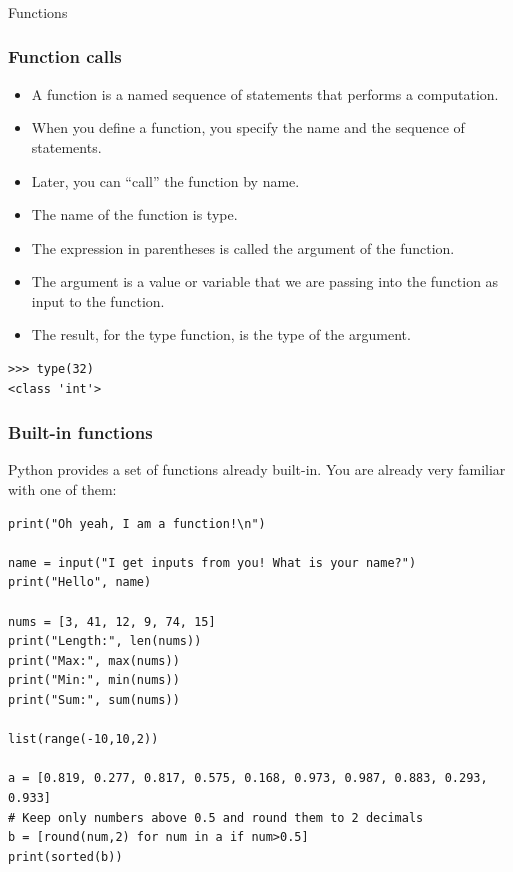 \begin{frame}[fragile]\frametitle{}
\begin{center}
{\Large Functions}
\end{center}
\end{frame}


\begin{frame}[fragile]\frametitle{Function calls}
    \begin{itemize}
    \item  A function is a named sequence of statements that
performs a computation.
    \item  When you define a function, you specify the name and
the sequence of statements.
    \item  Later, you can ``call'' the function by name.
    \item  The name of the function is type.
    \item The expression in parentheses is called the argument of the function.
    \item The argument is a value or variable that we are passing into the function as input to the function.
    \item The result, for the type function, is the type of the argument.
    \end{itemize}
\begin{lstlisting}
>>> type(32)
<class 'int'>
\end{lstlisting}
\end{frame}

\begin{frame}[fragile]\frametitle{Built-in functions}
Python provides a set of functions already built-in. You are already very familiar with one of them:
\begin{lstlisting}
print("Oh yeah, I am a function!\n")

name = input("I get inputs from you! What is your name?")
print("Hello", name)

nums = [3, 41, 12, 9, 74, 15]
print("Length:", len(nums))
print("Max:", max(nums))
print("Min:", min(nums))
print("Sum:", sum(nums))

list(range(-10,10,2))

a = [0.819, 0.277, 0.817, 0.575, 0.168, 0.973, 0.987, 0.883, 0.293, 0.933]
# Keep only numbers above 0.5 and round them to 2 decimals
b = [round(num,2) for num in a if num>0.5]
print(sorted(b))
\end{lstlisting}
\end{frame}


